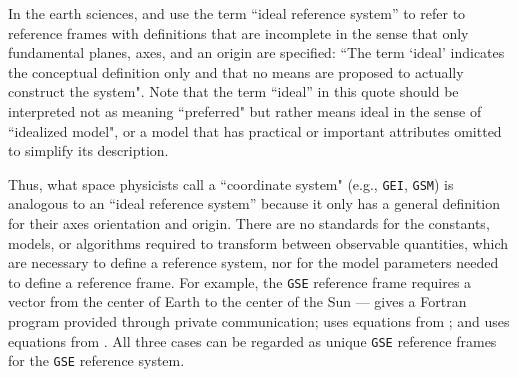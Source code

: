 \documentclass[draft]{agujournal2019}
\begin{document}
In the earth sciences,  and  use the term ``ideal reference system'' to refer to reference frames with definitions that are incomplete in the sense that only fundamental planes, axes, and an origin are specified: ``The term `ideal' indicates the conceptual definition only and that no means are proposed to actually construct the system". Note that the term ``ideal'' in this quote should be interpreted not as meaning ``preferred" but rather means ideal in the sense of ``idealized model", or a model that has practical or important attributes omitted to simplify its description.



Thus, what space physicists call a ``coordinate system" (e.g., \texttt{GEI}, \texttt{GSM}) is analogous to an ``ideal reference system'' because it only has a general definition for their axes orientation and origin. There are no standards for the constants, models, or algorithms required to transform between observable quantities, which are necessary to define a reference system, nor for the model parameters needed to define a reference frame. For example, the \texttt{GSE} reference frame requires a vector from the center of Earth to the center of the Sun ---  gives a Fortran program provided through private communication;  uses equations from ; and  uses equations from . All three cases can be regarded as unique \texttt{GSE} reference frames for the \texttt{GSE} reference system.
\end{document}
